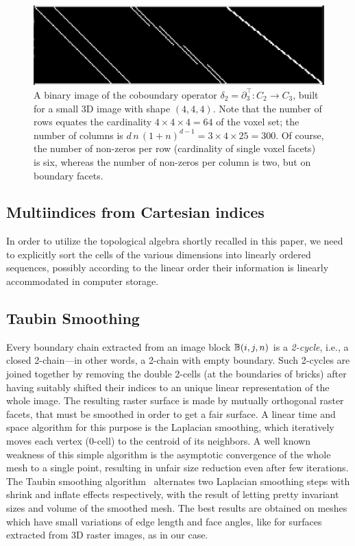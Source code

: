 \documentclass[11pt, oneside]{amsart}   	%
\begin{document}
\begin{figure}[tbp] %
   \centering
   \includegraphics[width=0.75\linewidth]{figs/boundary_matrix_4x4x4.pdf} 
   \caption{A binary image of the coboundary operator  $\delta_2 = \partial_3^\top : C_2 \to C_3$, built for a small 3D image with shape $(4,4,4)$. Note that the number of rows equates the cardinality $4\times 4\times 4 = 64$ of the voxel set; the number of columns is $d\,n\,(1+n)^{d-1} = 3\times 4\times 25 = 300$. Of course, the number of non-zeros per row (cardinality of single voxel facets) is six, whereas the number of non-zeros per column is two, but on boundary facets.}
   \label{fig:boundary_matrix_4x4x4}
\end{figure}

\subsection{Multiindices from Cartesian indices}\label{sec:aaaa}

In order to utilize the topological algebra shortly recalled in this paper, we need to explicitly sort the cells of the various dimensions into linearly ordered sequences, possibly according to the linear order their information is linearly accommodated in computer storage. 

\subsection{Taubin Smoothing}\label{sec:aaaa}

Every boundary chain extracted from an image block $\mathbb{B}(i,j,n)$ is a \emph{2-cycle}, i.e., a closed 2-chain---in other words, a 2-chain with empty boundary. Such 2-cycles are joined together by removing the double 2-cells (at the boundaries of bricks) after having suitably shifted their indices to an unique linear representation of the whole image. The resulting raster surface is made by mutually orthogonal raster facets, that must be smoothed in order to get a fair surface. A linear time and space algorithm for this purpose is the Laplacian smoothing, which iteratively  moves each vertex (0-cell) to the centroid of its neighbors. A well known weakness of this simple algorithm is the asymptotic convergence of the whole mesh to a single point, resulting in unfair size reduction even after few iterations.  The Taubin smoothing algorithm~\cite{Taubin:1995:SPA:218380.218473,egst.20001029} alternates two Laplacian smoothing steps with shrink and inflate effects respectively, with the result of letting pretty invariant sizes and volume of the smoothed mesh.
The best results are obtained on meshes which have small variations of edge length and face angles, like for surfaces extracted from 3D raster images, as in our case.
 
\end{document}

